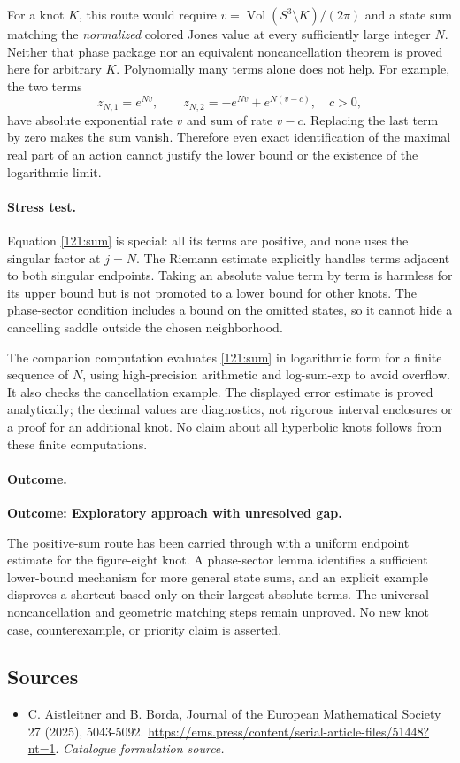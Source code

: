 \documentclass[11pt,a4paper]{article}
\numberwithin{equation}{section}
\begin{document}
For a knot $K$, this route would require $v=\operatorname{Vol}(S^3
\setminus K)/(2\pi)$ and a state sum matching the \emph{normalized}
colored Jones value at every sufficiently large integer $N$.  Neither
that phase package nor an equivalent noncancellation theorem is proved
here for arbitrary $K$.  Polynomially many terms alone does not help.
For example, the two terms
\[
 z_{N,1}=e^{Nv},\qquad z_{N,2}=-e^{Nv}+e^{N(v-c)},\quad c>0,
\]
have absolute exponential rate $v$ and sum of rate $v-c$.
Replacing the last term by zero makes the sum vanish.  Therefore even
exact identification of the maximal real part of an action cannot
justify the lower bound or the existence of the logarithmic limit.

\paragraph{Stress test.}
Equation \eqref{121:sum} is special: all its terms are positive, and none
uses the singular factor at $j=N$.  The Riemann estimate explicitly
handles terms adjacent to both singular endpoints.  Taking an absolute
value term by term is harmless for its upper bound but is not promoted
to a lower bound for other knots.  The phase-sector condition includes
a bound on the omitted states, so it cannot hide a cancelling saddle
outside the chosen neighborhood.

The companion computation evaluates \eqref{121:sum} in logarithmic
form for a finite sequence of $N$, using high-precision arithmetic and
log-sum-exp to avoid overflow.  It also checks the cancellation example.
The displayed error estimate is proved analytically; the decimal
values are diagnostics, not rigorous interval enclosures or a proof
for an additional knot.  No claim about all hyperbolic knots follows
from these finite computations.

\paragraph{Outcome.}
\textbf{Outcome: Exploratory approach with unresolved gap.}

The positive-sum route has been carried through with a uniform endpoint
estimate for the figure-eight knot.  A phase-sector lemma identifies a
sufficient lower-bound mechanism for more general state sums, and an
explicit example disproves a shortcut based only on their largest
absolute terms.  The universal noncancellation and geometric matching
steps remain unproved.  No new knot case, counterexample, or priority
claim is asserted.
\subsection{Sources}
\begin{itemize}\raggedright
\item[\textnormal{[S1]}]\hypertarget{source:121:1}{} C. Aistleitner and B. Borda, Journal of the European Mathematical Society 27 (2025), 5043-5092.
\url{https://ems.press/content/serial-article-files/51448?nt=1}.
{\small\textit{Catalogue formulation source.}}
\end{itemize}
\end{document}
